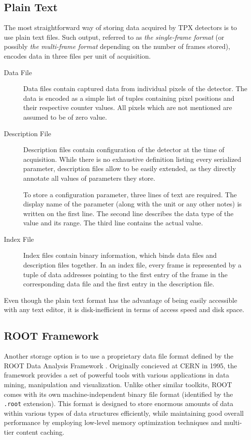 \subsection{Plain Text}
The most straightforward way of storing data acquired by TPX detectors is to use plain text files. Such output, referred to as \textit{the single-frame format} (or possibly \textit{the multi-frame format} depending on the number of frames stored), encodes data in three files per unit of acquisition.

\begin{description}
	\item[Data File]
	Data files contain captured data from individual pixels of the detector. The data is encoded as a simple list of tuples containing pixel positions and their respective counter values. All pixels which are not mentioned are assumed to be of zero value.

	\item[Description File]
	Description files contain configuration of the detector at the time of acquisition. While there is no exhaustive definition listing every serialized parameter, description files allow to be easily extended, as they directly annotate all values of parameters they store.

	To store a configuration parameter, three lines of text are required. The display name of the parameter (along with the unit or any other notes) is written on the first line. The second line describes the data type of the value and its range. The third line contains the actual value.

	\item[Index File]
	Index files contain binary information, which binds data files and description files together. In an index file, every frame is represented by a tuple of data addresses pointing to the first entry of the frame in the corresponding data file and the first entry in the description file.
\end{description}

Even though the plain text format has the advantage of being easily accessible with any text editor, it is disk-inefficient in terms of access speed and disk space.

\subsection{ROOT Framework}
\label{storage:ROOT}
Another storage option is to use a proprietary data file format defined by the ROOT Data Analysis Framework \cite{Brun199781}. Originally concieved at CERN in 1995, the framework provides a set of powerful tools with various applications in data mining, manipulation and visualization. Unlike other similar toolkits, ROOT comes with its own machine-independent binary file format (identified by the \texttt{.root} extension). This format is designed to store enormous amounts of data within various types of data structures efficiently, while maintaining good overall performance by employing low-level memory optimization techniques and multi-tier content caching.

